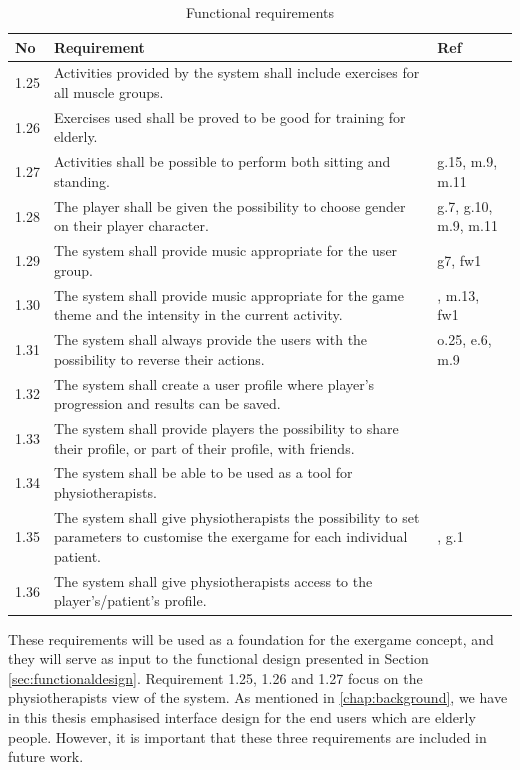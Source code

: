 \begin{table} [H]
\centering
\begin{tabular}{|>{\raggedright}p{}|p{}|p{}|}
\hline
\textbf{No} & \textbf{Requirement} & \textbf{Ref} \\ \hline
1.25 & Activities provided by the system shall include exercises for all muscle groups. & \cite{guidelines} \\ \hline
1.26 & Exercises used shall be proved to be good for training for elderly. & \cite{project} \\ \hline
1.27 & Activities shall be possible to perform both sitting and standing. & g.15, m.9, m.11 \\ \hline
1.28 & The player shall be given the possibility to choose gender on their player character. &  g.7, g.10, m.9, m.11 \\ \hline
1.29 & The system shall provide music appropriate for the user group. & g7, fw1 \\ \hline
1.30 & The system shall provide music appropriate for the game theme and the intensity in the current activity. & \cite{umlapproach}, m.13, fw1 \\ \hline
1.31 & The system shall always provide the users with the possibility to reverse their actions. & o.25, e.6, m.9 \\ \hline
1.32 & The system shall create a user profile where player's progression and results can be saved. & \cite{project} \\ \hline
1.33 & The system shall provide players the possibility to share their profile, or part of their profile, with friends. &  \cite{sweetser}\\ \hline
1.34 & The system shall be able to be used as a tool for physiotherapists. & \cite{project}\\ \hline
1.35 & The system shall give physiotherapists the possibility to set parameters to customise the exergame for each individual patient. & \cite{project}, g.1  \\ \hline
1.36 & The system shall give physiotherapists access to the player's/patient's profile. & \cite{project}\\ \hline  
\end{tabular}
\caption[Functional requirements, part 3]{Functional requirements}
\label{tab:func3}
\end{table} 

These requirements will be used as a foundation for the exergame concept, and they will serve as input to the functional design presented in Section \ref{sec:functionaldesign}. Requirement 1.25, 1.26 and 1.27 focus on the physiotherapists view of the system. As mentioned in \ref{chap:background}, we have in this thesis emphasised interface design for the end users which are elderly people. However, it is important that these three requirements are included in future work.

